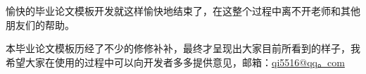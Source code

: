 \begin{Summary}

    愉快的毕业论文模板开发就这样愉快地结束了，在这整个过程中离不开老师和其他朋友们的帮助。

    本毕业论文模板历经了不少的修修补补，最终才呈现出大家目前所看到的样子，我希望大家在使用的过程中可以向开发者多多提供意见，邮箱：\href{mailto:qi5516@qq。com}{qi5516@qq。com}

\end{Summary}